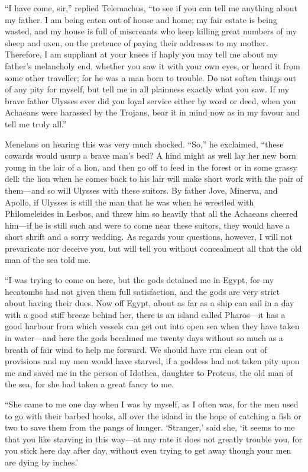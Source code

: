 “I have come, sir,” replied Telemachus, “to see if you can tell me anything
about my father. I am being eaten out of house and home; my fair estate is
being wasted, and my house is full of miscreants who keep killing great numbers
of my sheep and oxen, on the pretence of paying their addresses to my mother.
Therefore, I am suppliant at your knees if haply you may tell me about my
father’s melancholy end, whether you saw it with your own eyes, or heard it
from some other traveller; for he was a man born to trouble. Do not soften
things out of any pity for myself, but tell me in all plainness exactly what
you saw. If my brave father Ulysses ever did you loyal service either by word
or deed, when you Achaeans were harassed by the Trojans, bear it in mind now as
in my favour and tell me truly all.”

Menelaus on hearing this was very much shocked. “So,” he exclaimed, “these
cowards would usurp a brave man’s bed? A hind might as well lay her new born
young in the lair of a lion, and then go off to feed in the forest or in some
grassy dell: the lion when he comes back to his lair will make short work with
the pair of them—and so will Ulysses with these suitors. By father Jove,
Minerva, and Apollo, if Ulysses is still the man that he was when he wrestled
with Philomeleides in Lesbos, and threw him so heavily that all the Achaeans
cheered him—if he is still such and were to come near these suitors, they would
have a short shrift and a sorry wedding. As regards your questions, however, I
will not prevaricate nor deceive you, but will tell you without concealment all
that the old man of the sea told me.

“I was trying to come on here, but the gods detained me in Egypt, for my
hecatombs had not given them full satisfaction, and the gods are very strict
about having their dues. Now off Egypt, about as far as a ship can sail in a
day with a good stiff breeze behind her, there is an island called Pharos—it
has a good harbour from which vessels can get out into open sea when they have
taken in water—and here the gods becalmed me twenty days without so much as a
breath of fair wind to help me forward. We should have run clean out of
provisions and my men would have starved, if a goddess had not taken pity upon
me and saved me in the person of Idothea, daughter to Proteus, the old man of
the sea, for she had taken a great fancy to me.

“She came to me one day when I was by myself, as I often was, for the men used
to go with their barbed hooks, all over the island in the hope of catching a
fish or two to save them from the pangs of hunger. ‘Stranger,’ said she, ‘it
seems to me that you like starving in this way—at any rate it does not greatly
trouble you, for you stick here day after day, without even trying to get away
though your men are dying by inches.’

